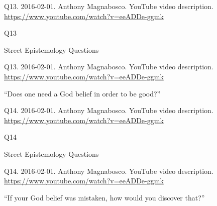 \documentclass[
    src/templates/5x2-on-a4paper,
    frame
]{flashcards}
\newcommand{\myheader}{}
\newcommand{\myfooter}{
    \begin{flushright}
        \small\sc
        Street Epistemology Questions \par
    \end{flushright}
}
\begin{document}
        \renewcommand{\myheader}{
            \normalfont %
            \begin{tiny}
                Q13.
                2016-02-01.
                Anthony Magnabosco.
                    YouTube video description.
                    \\
                    \url{ https://www.youtube.com/watch?v=eeADDe-ggmk }
                \par
            \end{tiny}
        }
        \begin{flashcard}{
            \myheader
            \vspace{\fill}
            \begin{center}
                \large
                    Q13
            \end{center}
            \vspace{\fill}
            \myfooter
            \vspace{-1.4ex}
        }
            \myheader
            \vspace{\fill}
            \begin{center}
                \large
\enquote{Does one need a God belief in order to be good?}            \end{center}
            \vspace{\fill}
        \end{flashcard}
        \renewcommand{\myheader}{
            \normalfont %
            \begin{tiny}
                Q14.
                2016-02-01.
                Anthony Magnabosco.
                    YouTube video description.
                    \\
                    \url{ https://www.youtube.com/watch?v=eeADDe-ggmk }
                \par
            \end{tiny}
        }
        \begin{flashcard}{
            \myheader
            \vspace{\fill}
            \begin{center}
                \large
                    Q14
            \end{center}
            \vspace{\fill}
            \myfooter
            \vspace{-1.4ex}
        }
            \myheader
            \vspace{\fill}
            \begin{center}
                \large
\enquote{If your God belief was mistaken, how would you discover that?}            \end{center}
            \vspace{\fill}
        \end{flashcard}
\end{document}
